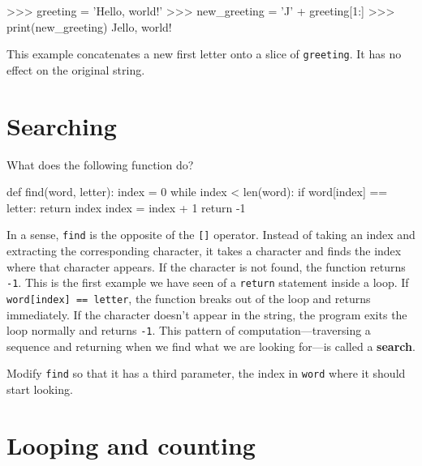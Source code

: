 \beforeverb
\begin{pycode}
>>> greeting = 'Hello, world!'
>>> new_greeting = 'J' + greeting[1:]
>>> print(new_greeting)
Jello, world!
\end{pycode}
\afterverb
%
This example concatenates a new first letter onto
a slice of {\tt greeting}.  It has no effect on
the original string.



\section{Searching}
\label{find}

What does the following function do?


\beforeverb
\begin{pycode}
def find(word, letter):
    index = 0
    while index < len(word):
        if word[index] == letter:
            return index
        index = index + 1
    return -1
\end{pycode}
\afterverb
%
In a sense, {\tt find} is the opposite of the {\tt []} operator.
Instead of taking an index and extracting the corresponding character,
it takes a character and finds the index where that character
appears.  If the character is not found, the function returns {\tt
-1}.
%
This is the first example we have seen of a {\tt return} statement
inside a loop.  If {\tt word[index] == letter}, the function breaks
out of the loop and returns immediately.
%
If the character doesn't appear in the string, the program
exits the loop normally and  returns {\tt -1}.
%
This pattern of computation---traversing a sequence and returning
when we find what we are looking for---is called a {\bf search}.


\begin{exercise}
Modify {\tt find} so that it has a
third parameter, the index in {\tt word} where it should start
looking.
\end{exercise}


\section{Looping and counting}
\label{counter}


